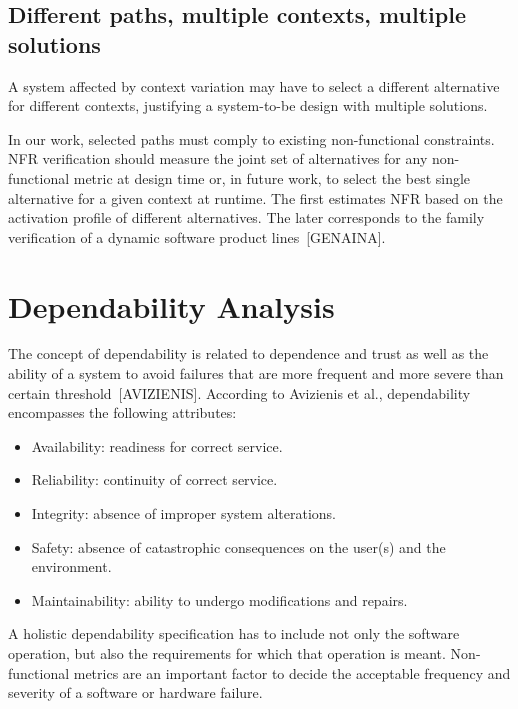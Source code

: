 \subsection{Different paths, multiple contexts, multiple  solutions}

A system affected by context variation may have to select a different alternative for different contexts, justifying a system-to-be design with multiple solutions. 

In our work, selected paths must comply to existing non-functional constraints. NFR verification should measure the joint set of alternatives for any non-functional metric at design time or, in future work, to select the best single alternative for a given context at runtime. The first estimates NFR based on the activation profile of different alternatives. The later corresponds to the family verification of a dynamic software product lines~[GENAINA].

\section{Dependability Analysis}

The concept of dependability is related to dependence and trust as well as the ability of a system to avoid failures that are more frequent and more severe than certain threshold~[AVIZIENIS]. According to Avizienis et al., dependability encompasses the following attributes: 

\begin{itemize}

\item Availability: readiness for correct service.
\medskip

\item Reliability: continuity of correct service.
\medskip

\item Integrity: absence of improper system alterations.
\medskip

\item Safety: absence of catastrophic consequences on the user(s) and the environment.
\medskip

\item Maintainability: ability to undergo modifications and repairs.
\medskip

\end{itemize}


A holistic dependability specification has to include not only the software operation, but also the requirements for which that operation is meant. Non-functional metrics are an important factor to decide the acceptable frequency and severity of a software or hardware failure. 

